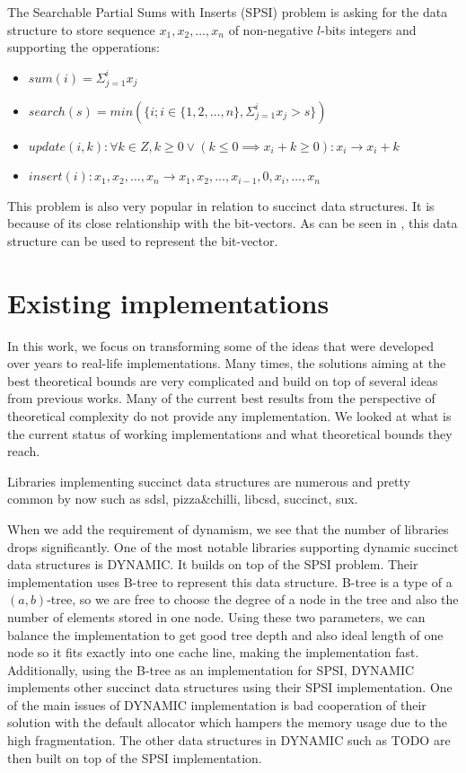 \begin{theorem}
The Searchable Partial Sums with Inserts (SPSI) problem is asking for the data structure to
store sequence $x_1, x_2, \ldots , x_n$ of non-negative $l$-bits integers and supporting the opperations:
\begin{itemize}
    \item $sum(i) = \Sigma_{j=1}^{i} x_j$
    \item $search(s) = min(\{i; i\in \{1, 2,\ldots, n\}, \Sigma_{j=1}^{i} x_j > s \})$
    \item $update(i, k): \forall k \in Z, k \geq 0 \lor (k\leq 0 \implies x_i + k \geq 0): x_i \rightarrow x_i + k$
    \item $insert(i): x_1, x_2,\ldots, x_n \rightarrow x_1, x_2,\ldots , x_{i-1}, 0, x_{i}, \ldots , x_n$
\end{itemize}
\end{theorem}

This problem is also very popular in relation to succinct data structures. It is because of its close relationship with the bit-vectors.
As can be seen in \cite{prezza2017framework}, this data structure can be used to represent the bit-vector.

\section{Existing implementations}

In this work, we focus on transforming some of the ideas that were developed over years to real-life implementations. Many times, the solutions aiming at the best theoretical bounds are very complicated and build on top of several ideas from previous works. Many of the current best results from the perspective of theoretical complexity do not provide any implementation. We looked at what is the current status of working implementations and what theoretical bounds they reach.

Libraries implementing succinct data structures are numerous and pretty common by now such as sdsl\cite{gog2014theory}, pizza\&chilli\cite{pizza-chilli}, libcsd\cite{brisaboa2011compressed}, succinct\cite{succinct}, sux\cite{sux}.

When we add the requirement of dynamism, we see that the number of libraries drops significantly. One of the most notable libraries supporting 
dynamic succinct data structures is DYNAMIC. It builds on top of the SPSI problem. Their implementation uses B-tree to represent this data structure. B-tree is a type of a $(a, b)$-tree, so we are free to choose the degree of a node in the tree and also the number of elements stored in one node. Using these two parameters, we can balance the implementation to get good tree depth and also ideal length of one node so it fits exactly into one cache line, making the implementation fast. Additionally, using the B-tree as an implementation for SPSI, DYNAMIC implements other succinct
data structures using their SPSI implementation. One of the main issues of DYNAMIC implementation is bad cooperation of their solution with the default allocator which hampers the memory usage due to the high fragmentation. The other data structures in DYNAMIC such as TODO are then built on top of the SPSI implementation.

